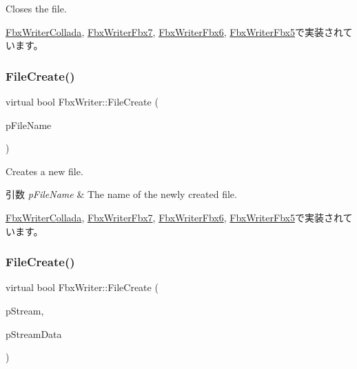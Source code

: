 Closes the file. 

\hyperlink{class_fbx_writer_collada_ae33b59a7bdbd04cca55a4632c7204f5e}{Fbx\+Writer\+Collada}, \hyperlink{class_fbx_writer_fbx7_aba83cb046ac5f4154443bdf3bd1503c0}{Fbx\+Writer\+Fbx7}, \hyperlink{class_fbx_writer_fbx6_a936f95dcb66f93ebd4ae2e8d8a0339b6}{Fbx\+Writer\+Fbx6}, \hyperlink{class_fbx_writer_fbx5_aa6731501c4006f1d4d18c32cea32e6c5}{Fbx\+Writer\+Fbx5}で実装されています。

\mbox{\label{class_fbx_writer_abe6729227cd6e3be5ee3ab0c1b8b0eda}} 
\subsubsection{\texorpdfstring{File\+Create()}{FileCreate()}\hspace{0.1cm}{\footnotesize\ttfamily [1/2]}}
{\footnotesize\ttfamily virtual bool Fbx\+Writer\+::\+File\+Create (\begin{DoxyParamCaption}\item[{char $\ast$}]{p\+File\+Name }\end{DoxyParamCaption})\hspace{0.3cm}{\ttfamily [pure virtual]}}

Creates a new file. 
\begin{DoxyParams}{引数}
{\em p\+File\+Name} & The name of the newly created file. \\
\hline
\end{DoxyParams}


\hyperlink{class_fbx_writer_collada_a973e285681d8486e74a200812eeee70a}{Fbx\+Writer\+Collada}, \hyperlink{class_fbx_writer_fbx7_ab76d4fdd92efb2a6506bde058bfde28e}{Fbx\+Writer\+Fbx7}, \hyperlink{class_fbx_writer_fbx6_ae7ad665b515f5896f2263cce0e5f38fc}{Fbx\+Writer\+Fbx6}, \hyperlink{class_fbx_writer_fbx5_a8abe68065893c971afb6b01bffc6bcaf}{Fbx\+Writer\+Fbx5}で実装されています。

\mbox{\label{class_fbx_writer_a9b64b6230b05e64a83b78b36d1667da7}} 
\subsubsection{\texorpdfstring{File\+Create()}{FileCreate()}\hspace{0.1cm}{\footnotesize\ttfamily [2/2]}}
{\footnotesize\ttfamily virtual bool Fbx\+Writer\+::\+File\+Create (\begin{DoxyParamCaption}\item[{\hyperlink{class_fbx_stream}{Fbx\+Stream} $\ast$}]{p\+Stream,  }\item[{void $\ast$}]{p\+Stream\+Data }\end{DoxyParamCaption})\hspace{0.3cm}{\ttfamily [virtual]}}

